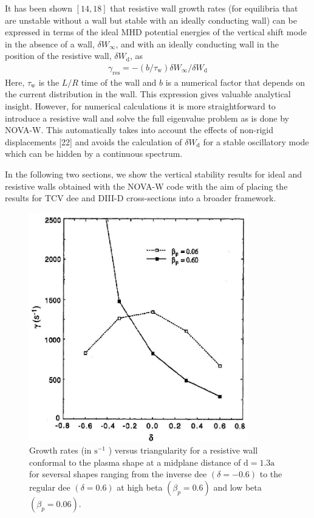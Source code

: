 \documentclass[utf8]{ctexart}
\begin{document}
\begin{sloppypar}
 It has been shown $[14,18]$ that resistive wall growth rates (for equilibria that are unstable without a wall but stable with an ideally conducting wall) can be expressed in terms of the ideal MHD potential energies of the vertical shift mode in the absence of a wall, $\delta W_{\infty}$, and with an ideally conducting wall in the position of the resistive wall, $\delta W_{\mathrm{d}}$, as
\begin{align*}
	 \gamma_{\mathrm{res}}=-\left(b / \tau_{\mathrm{w}}\right) \delta W_{\infty} / \delta W_{\mathrm{d}}
\end{align*}
 Here, $\tau_{\mathrm{w}}$ is the $L / R$ time of the wall and $b$ is a numerical factor that depends on the current distribution in the wall. This expression gives valuable analytical insight. However, for numerical calculations it is more straightforward to introduce a resistive wall and solve the full eigenvalue problem as is done by NOVA-W. This automatically takes into account the effects of non-rigid displacements [22] and avoids the calculation of $\delta W_{\mathrm{d}}$ for a stable oscillatory mode which can be hidden by a continuous spectrum.
 
 In the following two sections, we show the vertical stability results for ideal and resistive walls obtained with the NOVA-W code with the aim of placing the results for TCV dee and DIII-D cross-sections into a broader framework.
 \begin{figure}[H]
 	\centering
 	\includegraphics[max width=0.85\textwidth,max height=0.3\textheight]{2025_01_10_a0135324997886412d98g-6}
 	\caption{Growth rates (in $\mathrm{s}^{-1}$ ) versus triangularity for a resistive wall conformal to the plasma shape at a midplane distance of $\mathrm{d}=1.3 \mathrm{a}$ for seversal shapes ranging from the inverse dee $(\delta=-0.6)$ to the regular dee $(\delta=0.6)$ at high beta $\left(\beta_{p}=0.6\right)$ and low beta $\left(\beta_{p}=0.06\right)$.\\}
 	\label{fig4.}
 \end{figure}
 

\end{sloppypar}
\end{document}
